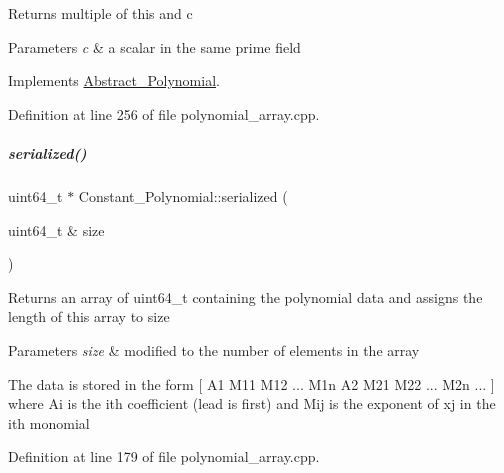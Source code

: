 \begin{DoxyReturn}{Returns}
multiple of {\ttfamily this} and {\ttfamily c} 
\end{DoxyReturn}

\begin{DoxyParams}{Parameters}
{\em c} & a scalar in the same prime field \\
\hline
\end{DoxyParams}


Implements \hyperlink{group__polygroup_a53b0ed425ff4bbbf01818005d6003d59}{Abstract\+\_\+\+Polynomial}.



Definition at line 256 of file polynomial\+\_\+array.\+cpp.

\mbox{\label{group__polygroup_aafc581313f33e812add8db45cfaa1492}} 
\subparagraph{\texorpdfstring{serialized()}{serialized()}}
{\footnotesize\ttfamily uint64\+\_\+t $\ast$ Constant\+\_\+\+Polynomial\+::serialized (\begin{DoxyParamCaption}\item[{uint64\+\_\+t \&}]{size }\end{DoxyParamCaption})}

\begin{DoxyReturn}{Returns}
an array of {\ttfamily uint64\+\_\+t} containing the polynomial data and assigns the length of this array to {\ttfamily size} 
\end{DoxyReturn}

\begin{DoxyParams}{Parameters}
{\em size} & modified to the number of elements in the array\\
\hline
\end{DoxyParams}
The data is stored in the form \mbox{[} A1 M11 M12 ... M1n A2 M21 M22 ... M2n ... \mbox{]} where Ai is the ith coefficient (lead is first) and Mij is the exponent of xj in the ith monomial 

Definition at line 179 of file polynomial\+\_\+array.\+cpp.

